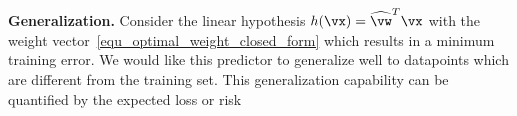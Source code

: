 \documentclass[12pt]{report}
\begin{document}
{\bf Generalization.}
Consider the linear hypothesis $h(\vx) = \widehat{\vw}^{T} \vx$ with the weight 
vector \eqref{equ_optimal_weight_closed_form} which results in a minimum 
training error. We would like this predictor to generalize well to datapoints 
which are different from the training set. This generalization capability can 
be quantified by the expected loss or risk %
%
%
\end{document}
